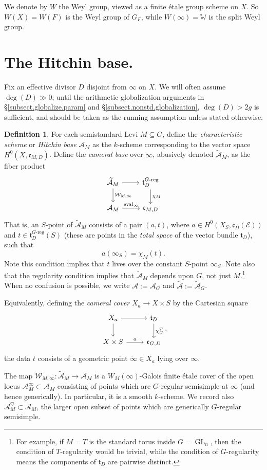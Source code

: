 \documentclass[openany]{amsbook}
\theoremstyle{definition}
\newtheorem{definition}[theorem]{Definition}
\theoremstyle{remark}
\numberwithin{equation}{section}
\newcommand{\W}{\mathbb{W}}
\newcommand{\cA}{\mathcal{A}}
\newcommand{\cE}{\mathcal{E}}
\renewcommand{\-}{\operatorname{-}}
\newcommand{\GL}{\operatorname{GL}}
\newcommand{\on}[1]{\operatorname{#1}}
\newcommand{\wtilde}[1]{\widetilde{#1}}
\newcommand{\ctA}{\widetilde{\cA}}
\newcommand{\ft}{\mathfrak{t}}
\newcommand{\fc}{\mathfrak{c}}
\newcommand{\Greg}{G\text{-reg}}
\begin{document}
We denote by $W$ the Weyl group, viewed as a finite \'etale group scheme on $X$. So $W(X) = W(F)$ is the Weyl group of $G_F$, while $W(\infty) = \W$ is the split Weyl group.


\section{The Hitchin base.}

Fix an effective divisor $D$ disjoint from $\infty$ on $X$. We will often assume $\deg(D) \gg 0$; until the arithmetic globalization arguments in \S \ref{subsect.globalize.param} and \S \ref{subsect.nonstd.globalization}, $\deg(D) > 2g$ is sufficient, and should be taken as the running assumption unless stated otherwise.

\begin{definition}\label{def.Hitchin.base}
    For each semistandard Levi $M \subseteq G$, define the \emph{characteristic scheme} or \emph{Hitchin base} $\cA_M$ as the $k$-scheme corresponding to the vector space $H^0(X, \fc_{M,D})$. Define the \emph{cameral base} over $\infty$, abusively denoted $\ctA_M$, as the fiber product
    \[
        \begin{tikzcd}[ampersand replacement=\&]
            \ctA_M \ar[r] \ar[d, "\mathcal{W}_{M,\infty}"] \& \ft_{D}^{\Greg} \ar[d, "\chi_M"] \\
            \cA_M \ar[r, "\on{eval}_\infty"] \& \fc_{M,D}
        \end{tikzcd}
    \]
    That is, an $S$-point of $\ctA_M$ consists of a pair $(a,t)$, where $a \in H^0(X_S, \fc_D(\cE))$ and $t \in \ft_D^{\Greg}(S)$ (these are points in the \emph{total space} of the vector bundle $\ft_D$), such that
    \[
        a(\infty_S) = \chi_M(t).
    \]
    Note this condition implies that $t$ lives over the constant $S$-point $\infty_S$. Note also that the regularity condition implies that $\ctA_M$ depends upon $G$, not just $M$.\footnote{For example, if $M = T$ is the standard torus inside $G = \GL_n$, then the condition of $T$-regularity would be trivial, while the condition of $G$-regularity means the components of $\ft_D$ are pairwise distinct.} When no confusion is possible, we write $\cA := \cA_G$ and $\ctA := \ctA_G$.

    Equivalently, defining the \emph{cameral cover} $X_a \to X \times S$ by the Cartesian square
    $$
        \begin{tikzcd}[ampersand replacement=\&]
            X_a \ar[r] \ar[d] \& \ft_{D} \ar[d, "\chi_G^T"] \\
            X \times S \ar[r, "a"] \& \fc_{G,D}
        \end{tikzcd},
    $$
    the data $t$ consists of a geometric point $\wtilde{\infty} \in X_a$ lying over $\infty$. 
    
    The map $\mathcal{W}_{M,\infty}: \ctA_{M} \to \cA_M$ is a $W_M(\infty)$-Galois finite \'etale cover of the open locus $\cA^{\infty}_M \subset\cA_M$ consisting of points which are $G$-regular semisimple at $\infty$ (and hence generically). In particular, it is a smooth $k$-scheme. We record also $\cA_M^{\heartsuit} \subset \cA_M$, the larger open subset of points which are generically $G$-regular semisimple.
\end{definition}
\end{document}

